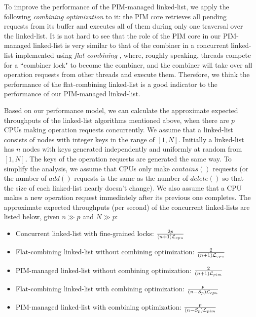 To improve the performance of the PIM-managed linked-list,
we apply the following \textit{combining optimization} to it:
the PIM core retrieves all pending requests from its buffer and
executes all of them during only one traversal over the linked-list.
It is not hard to see that the role of the PIM core in our PIM-managed linked-list
is very similar to that of the combiner in a concurrent linked-list implemented
using \textit{flat combining} \cite{Hendler10}, where, roughly speaking,
threads compete for a ``combiner lock" to become the combiner, and
the combiner will take over all operation requests from other threads and execute them.
Therefore, we think the performance of the flat-combining linked-list is a good indicator to
the performance of our PIM-managed linked-list.

Based on our performance model, we can calculate the approximate expected
throughputs of the linked-list algorithms mentioned above, 
when there are $p$ CPUs making operation requests concurrently.
We assume that a linked-list consists of nodes with integer keys in the range of $[1, N]$.
Initially a linked-list has $n$ nodes with keys generated independently
and uniformly at random from $[1, N]$.
The keys of the operation requests are generated the same way.
To simplify the analysis, we assume that CPUs only make $contains()$ requests
(or the number of $add()$ requests is the same as the number of $delete()$
so that the size of each linked-list nearly doesn't change).
We also assume that a CPU makes a new operation request immediately after
its previous one completes.
The approximate expected throughputs (per second) of the concurrent linked-lists
are listed below, given $n \gg p$ and $N \gg p$: 
\begin{itemize}
\item Concurrent linked-list with fine-grained locks:
	${2p \over (n+1)\mathcal{L}_{cpu}}$

\item Flat-combining linked-list without combining optimization:
	${2 \over (n+1)\mathcal{L}_{cpu}}$

\item PIM-managed linked-list without combining optimization:
	${2 \over (n+1)\mathcal{L}_{pim}}$

\item Flat-combining linked-list with combining optimization:
    ${p \over (n-\mathcal{S}_{p})\mathcal{L}_{cpu}}$

\item PIM-managed linked-list with combining optimization:
    ${p \over (n-\mathcal{S}_{p})\mathcal{L}_{pim}}$
\end{itemize}
